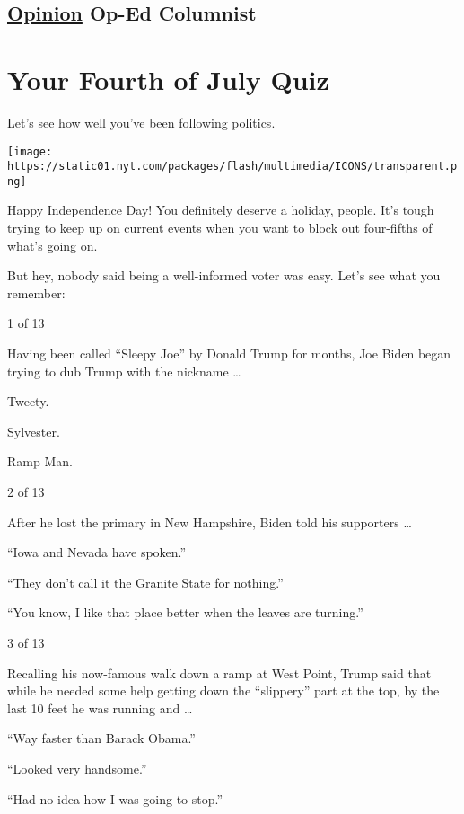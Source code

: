 \hypertarget{-opinion--op-ed-columnist}{%
\subsection{\texorpdfstring{ \href{/section/opinion}{Opinion}
\textbar{}Op-Ed
Columnist}{ Opinion  \textbar Op-Ed Columnist}}\label{-opinion--op-ed-columnist}}

\hypertarget{your-fourth-of-july-quiz}{%
\section{Your Fourth of July Quiz}\label{your-fourth-of-july-quiz}}

Let's see how well you've been following politics.

\texttt{[image: https://static01.nyt.com/packages/flash/multimedia/ICONS/transparent.png]}

Happy Independence Day! You definitely deserve a holiday, people. It's
tough trying to keep up on current events when you want to block out
four-fifths of what's going on.

But hey, nobody said being a well-informed voter was easy. Let's see
what you remember:

1 of 13

Having been called ``Sleepy Joe'' by Donald Trump for months, Joe Biden
began trying to dub Trump with the nickname \ldots{}

Tweety.

Sylvester.

Ramp Man.

2 of 13

After he lost the primary in New Hampshire, Biden told his supporters
\ldots{}

``Iowa and Nevada have spoken.''

``They don't call it the Granite State for nothing.''

``You know, I like that place better when the leaves are turning.''

3 of 13

Recalling his now-famous walk down a ramp at West Point, Trump said that
while he needed some help getting down the ``slippery'' part at the top,
by the last 10 feet he was running and \ldots{}

``Way faster than Barack Obama.''

``Looked very handsome.''

``Had no idea how I was going to stop.''

